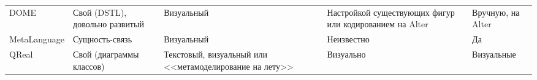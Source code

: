 \begin{table}[ht]
\begin{small}
\begin{longtabu} {| X[1 l p] | X[1 l p] | X[1 l p] | X[1 l p] |X[1 l p] |}
		DOME                         & Свой (DSTL), довольно развитый  & Визуальный                                              & Настройкой существующих фигур или кодированием на Alter  & Вручную, на Alter                              \\
		MetaLanguage                 & Сущность-связь                  & Визуальный                                              & Неизвестно                                               & Да                                             \\
		 QReal  & Свой (диаграммы классов)        & Текстовый, визуальный или <<метамоделирование на лету>> & Визуально                                                & Визуальные                                     
		\label{tab:existingPlatformsMain}
	\end{longtabu}
\end{small}
\end{table}

